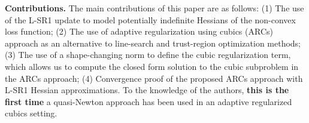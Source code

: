 \textbf{Contributions.}
The main contributions of this paper are as follows: 
(1) The use of the L-SR1 update to model potentially indefinite Hessians of the non-convex loss function;
(2) The use of adaptive regularization using cubics (ARCs) approach as an alternative to line-search and trust-region optimization methods;
(3) The use of a shape-changing norm to define the cubic regularization term, which allows us to compute the closed form solution to the cubic subproblem in the ARCs approach;
(4) Convergence proof of the proposed ARCs approach with L-SR1 Hessian approximations.
To the knowledge of the authors, \textbf{this is the first time} a quasi-Newton approach has been used in an adaptive regularized cubics setting. 

%

%







